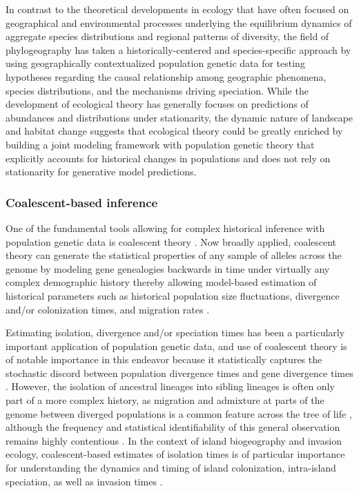 \documentclass[12pt]{article}
\begin{document}
In contrast to the theoretical developments in ecology that have often
focused on geographical and environmental processes underlying the
equilibrium dynamics of aggregate species distributions and regional
patterns of diversity, the field of phylogeography has taken a
historically-centered and species-specific approach by using
geographically contextualized population genetic data for testing
hypotheses regarding the causal relationship among geographic
phenomena, species distributions, and the mechanisms driving
speciation. While the development of ecological theory has generally
focuses on predictions of abundances and distributions under
stationarity, the dynamic nature of landscape and habitat change
suggests that ecological theory could be greatly enriched by building
a joint modeling framework with population genetic theory that
explicitly accounts for historical changes in populations and does not
rely on stationarity for generative model predictions.

\subsubsection{Coalescent-based
inference}

One of the fundamental tools allowing for complex historical inference
with population genetic data is coalescent theory \cite{Hudson1983-hx,
  Tajima1983-me, Kingman1982-uf, Kingman1982-ie, Rosenberg2002-ag}.
Now broadly applied, coalescent theory can generate the statistical
properties of any sample of alleles across the genome by modeling gene
genealogies backwards in time under virtually any complex demographic
history thereby allowing model-based estimation of historical
parameters such as historical population size fluctuations, divergence
and/or colonization times, and migration rates \cite{Wakeley2008-se}.

Estimating isolation, divergence and/or speciation times has been a
particularly important application of population genetic data, and use
of coalescent theory is of notable importance in this endeavor because
it statistically captures the stochastic discord between population
divergence times and gene divergence times \cite{Charlesworth2010-hn,
  Edwards2000-cs}. However, the isolation of ancestral lineages into
sibling lineages is often only part of a more complex history, as
migration and admixture at parts of the genome between diverged
populations is a common feature across the tree of life
\cite{Shapiro2016-rx, Mallet2016-iu, Sousa2013-ox, Nosil2008-km},
although the frequency and statistical identifiability of this general
observation remains highly contentious \cite{Cruickshank2014-bp,
  Yang2017-xy}. In the context of island biogeography and invasion
ecology, coalescent-based estimates of isolation times is of
particular importance for understanding the dynamics and timing of
island colonization, intra-island speciation, as well as invasion
times \cite{Estoup2003-ny, Estoup2004-cy, Hickerson2008-da,
  Gray2014-kp}.
\end{document}
